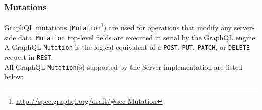 \subsubsection{Mutations}
\label{subsubsec:implementation_server_graphql_api_mutations}

GraphQL mutations (\texttt{Mutation}\footnote{\url{http://spec.graphql.org/draft/\#sec-Mutation}})
are used for operations that modify any server-side data. \texttt{Mutation} top-level
fields are executed in serial by the GraphQL engine. \\ %
A GraphQL \texttt{Mutation} is the logical equivalent of a \texttt{POST},
\texttt{PUT}, \texttt{PATCH}, or \texttt{DELETE} request in \texttt{REST}. \\ %
All GraphQL \texttt{Mutation}(s) supported by the Server implementation are
listed below:

